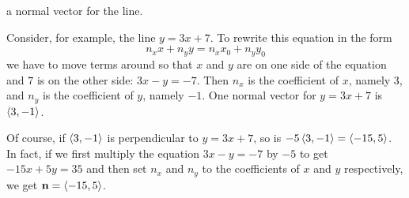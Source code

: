 a normal vector for the line. 
\begin{eg}
Consider, for example, the line $y=3x+7$. To rewrite this equation in the form 
$$
n_xx+n_yy= n_xx_0+n_yy_0
$$ 
we have to move terms around so that $x$ and
$y$ are on one side of the equation and $7$ is  on the other side:
 $3x-y=-7$. Then $n_x$ is the coefficient of $x$, namely $3$, and $n_y$
is the coefficient of $y$, namely $-1$. One normal vector
for $y=3x+7$ is $\left< 3,-1\right> $. 


Of course, if $\left< 3,-1\right> $ is perpendicular to $y=3x+7$, so is 
$-5\left< 3,-1\right> =\left< -15,5\right> $.
In fact, if we first multiply the equation $3x-y=-7$ by $-5$ to
get $-15x+5y=35$ and then set $n_x$ and $n_y$ to the coefficients of $x$
and $y$ respectively, we get $\mathbf{n}=\left< -15,5\right> $.
\end{eg}


